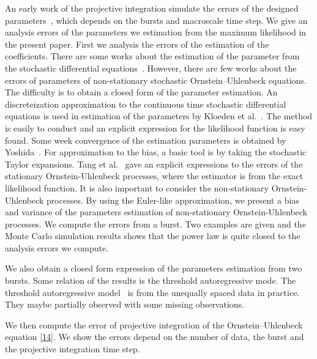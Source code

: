 \documentclass[12pt,reqno, a4paper]{article}
\numberwithin{equation}{section}
\begin{document}
An early work of the projective integration simulate the errors of the designed parameters~\cite{Chen}, which depends on the bursts and macroscale time step.  We give an analysis errors of the parameters we estimation from the maximum likelihood in the present paper. First we analysis the errors of the estimation of the coefficients.   There are some works about  the estimation of the parameter from the stochastic differential equations~\cite[e.g.]{Ait, Bish, Ste}.  However, there are few works about the errors of  parameters of  non-stationary stochastic Ornstein--Uhlenbeck  equations.  The difficulty is to obtain a closed form of the parameter estimation.   An discreteization approximation to the continuous time stochastic differential equations  is used in estimation of the parameters by Kloeden et al.~\cite{Klo}.  The method is easily to conduct and an explicit expression for the likelihood function is easy found. Some week convergence of the estimation parameters is obtained by Yoshida~\cite{Yosh}.   For approximation to the bias, a basic tool is by taking the stochastic Taylor expansions.    Tang et al.~\cite{Tang, Pe} gave an explicit expressions to  the  errors of the stationary  Ornstein-Uhlenbeck  processes, where the estimator is from the exact likelihood function. It is also important to consider the non-stationary   Ornstein-Uhlenbeck   processes. By using the Euler-like approximation, we present a bias and variance of the parameters estimation of non-stationary   Ornstein-Uhlenbeck  processes. We compute the errors from a burst. Two examples  are given and the  Monte Carlo simulation results shows that the power law is quite closed to the analysis errors we compute.

We also obtain a closed form expression of the parameters estimation from two bursts.  Some relation of the results is the threshold autoregressive mode.   The  threshold autoregressive model~\cite{Cha} is from the unequally spaced data in practice. They maybe partially observed with some missing observations.  %

We then compute the error of  projective integration of the  Ornstein--Uhlenbeck  equation \eqref{14}. We show the errors  depend on  the number of  data, the burst and the projective integration  time step.


\end{document}
